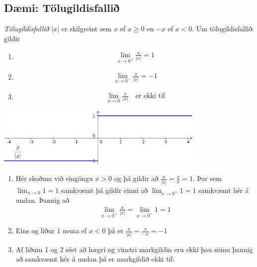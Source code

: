 \documentclass[b5paper,11pt,icelandic]{sphinxmanual}
\begin{document}
\subsection{Dæmi: Tölugildisfallið}
\label{kafli02:daemi-tolugildisfalli}
\textit{Tölugildisfallið} \(|x|\) er skilgreint sem \(x\)
ef \(x\geq 0\) en \(-x\) ef \(x<0\). Um tölugildisfallið gildir
\begin{enumerate}
\item {} \begin{equation*}
\begin{split}\lim_{x\to 0^+} \frac x{|x|} = 1\end{split}
\end{equation*}
\item {} \begin{equation*}
\begin{split}\lim_{x\to 0^-} \frac x{|x|} = -1\end{split}
\end{equation*}
\item {} \begin{equation*}
\begin{split}\lim_{x\to 0} \frac x{|x|} \quad \text{er ekki til}\end{split}
\end{equation*}
\end{enumerate}

\begin{center}
  \includegraphics[width=10cm]{02_daemi.png}          
    \end{center}  
\begin{enumerate}
\item {} 
Hér skoðum við eingöngu \(x>0\) og þá gildir að
\(\frac x{|x|} = \frac xx = 1\). Þar sem
\(\lim_{x \to 0} 1 = 1\) samkvæmt {\hyperref[kafli02:daemi2\string-1]{}}
þá gildir einni að \(\lim_{x \to 0^+} 1 = 1\) samkvæmt
{\hyperref[kafli02:setning\string-hv\string-markgildi]{}}
hér á undan. Þannig að
\begin{equation*}
\begin{split}\lim_{x \to 0^+} \frac x{|x|} =
\lim_{x \to 0^+} 1 = 1\end{split}
\end{equation*}
\item {} 
Eins og liður 1 nema ef \(x<0\) þá er
\(\frac x{|x|} = \frac x{-x} = -1\)

\item {} 
Af liðum 1 og 2 sést að hægri og vinstri markgildin eru ekki þau sömu þannig
að samkvæmt {\hyperref[kafli02:setning\string-hv\string-markgildi]{}} hér á undan þá er
markgildið ekki til.

\end{enumerate}
\end{document}
